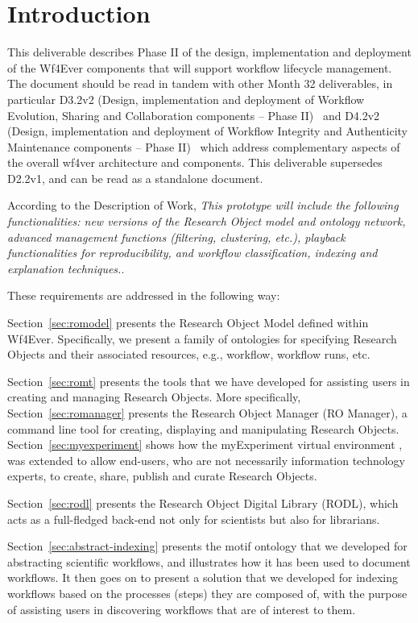 \section{Introduction}

This deliverable describes Phase II of the design, implementation and
deployment of the Wf4Ever components that will support workflow
lifecycle management. The document should be read in tandem with other
Month 32 deliverables, in particular D3.2v2 (Design, implementation
and deployment of Workflow Evolution, Sharing and Collaboration
components -- Phase II)~\cite{D3.2v2} and D4.2v2 (Design,
implementation and deployment of Workflow Integrity and Authenticity
Maintenance components -- Phase II)~\cite{D4.2v2} which address
complementary aspects of the overall wf4ver architecture and
components. This deliverable supersedes D2.2v1, and can be read as a standalone document. 

According to the Description of Work, \emph{This prototype will include the following functionalities: new versions of the Research Object model and ontology network, advanced management functions (filtering, clustering, etc.), playback functionalities for reproducibility, and workflow classification, indexing and explanation techniques.}. 

These requirements are addressed in the following way:

Section~\ref{sec:romodel} presents the Research Object Model defined within Wf4Ever. Specifically, we present a family of ontologies for specifying Research Objects and their associated resources, e.g., workflow, workflow runs, etc. 

Section~\ref{sec:romt} presents the tools that we have developed for assisting users in creating and managing Research Objects. More specifically, Section~\ref{sec:romanager} presents the Research Object Manager (RO Manager), a command line tool for creating, displaying and manipulating Research Objects. Section~\ref{sec:myexperiment} shows how the myExperiment virtual environment \cite{DBLP:journals/fgcs/RoureGS09}, was extended to allow end-users, who are not necessarily information technology experts, to create, share, publish and curate Research Objects.

Section~\ref{sec:rodl} presents the Research Object Digital Library (RODL), which acts as a full-fledged back-end not only for scientists but also for librarians. 

Section~\ref{sec:abstract-indexing} presents the motif ontology that we developed for abstracting scientific workflows, and illustrates how it has been used to document workflows. It then goes on to present a solution that we developed for indexing workflows based on the processes (steps) they are composed of, with the purpose of assisting users in discovering workflows that are of interest to them. 
